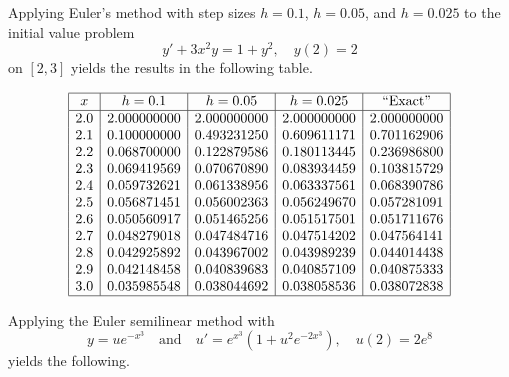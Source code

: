 \documentclass{ximera}
\begin{document}
\begin{example}\label{example:3.1.6}
Applying Euler's method with step sizes $h=0.1$, $h=0.05$, and
$h=0.025$ to  the initial value problem
\begin{equation}\label{eq:3.1.26}
y'+3x^2y=1+y^2,\quad y(2)=2
\end{equation}
on  $[2,3]$ yields the results in the following table. 

$$
\begin{array}{|c|c|c|c|c|}
\hline
x&
h=0.1&
h=0.05&
h=0.025&
\text{``Exact''} \\ \hline
2.0 &2.000000000 & 2.000000000 & 2.000000000 & 2.000000000 \\
2.1 &0.100000000 & 0.493231250 & 0.609611171 & 0.701162906 \\
2.2 &0.068700000 & 0.122879586 & 0.180113445 & 0.236986800 \\
2.3 &0.069419569 & 0.070670890 & 0.083934459 & 0.103815729 \\
2.4 &0.059732621 & 0.061338956 & 0.063337561 & 0.068390786 \\
2.5 &0.056871451 & 0.056002363 & 0.056249670 & 0.057281091 \\
2.6 &0.050560917 & 0.051465256 & 0.051517501 & 0.051711676 \\
2.7 &0.048279018 & 0.047484716 & 0.047514202 & 0.047564141 \\
2.8 &0.042925892 & 0.043967002 & 0.043989239 & 0.044014438 \\
2.9 &0.042148458 & 0.040839683 & 0.040857109 & 0.040875333 \\
3.0 &0.035985548 & 0.038044692 & 0.038058536 & 0.038072838 \\
\hline
\end{array}
$$


Applying the Euler semilinear method with
$$
y=ue^{-x^3}\quad\mbox{and}\quad u'=e^{x^3}(1+u^2e^{-2x^3}),\quad
u(2)=2e^8
$$
yields the following. 


\end{example}
\end{document}
